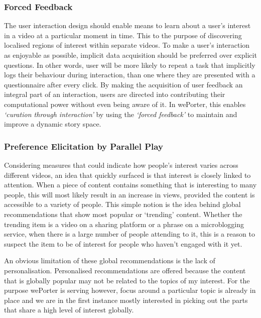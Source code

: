 \subsubsection{Forced Feedback}
The user interaction design should enable means to learn about a user's interest in a video at a particular moment in time. This to the purpose of discovering localised regions of interest within separate videos. To make a user's interaction as enjoyable as possible, implicit data acquisition should be preferred over explicit questions. In other words, user will be more likely to repeat a task that implicitly logs their behaviour during interaction, than one where they are presented with a questionnaire after every click. By making the acquisition of user feedback an integral part of an interaction, users are directed into contributing their computational power without even being aware of it. In wePorter, this enables \emph{`curation through interaction'} by using the \emph{`forced feedback'} to maintain and improve a dynamic story space.

\subsubsection{Preference Elicitation by Parallel Play}

Considering measures that could indicate how people's interest varies across different videos, an idea that quickly surfaced is that interest is closely linked to attention. When a piece of content contains something that is interesting to many people, this will most likely result in an increase in views, provided the content is accessible to a variety of people. This simple notion is the idea behind global recommendations that show most popular or `trending' content. Whether the trending item is a video on a sharing platform or a phrase on a microblogging service, when there is a large number of people attending to it, this is a reason to suspect the item to be of interest for people who haven't engaged with it yet.

An obvious limitation of these global recommendations is the lack of personalisation. Personalised recommendations are offered because the content that is globally popular may not be related to the topics of my interest. For the purpose wePorter is serving however, focus around a particular topic is already in place and we are in the first instance mostly interested in picking out the parts that share a high level of interest globally.


